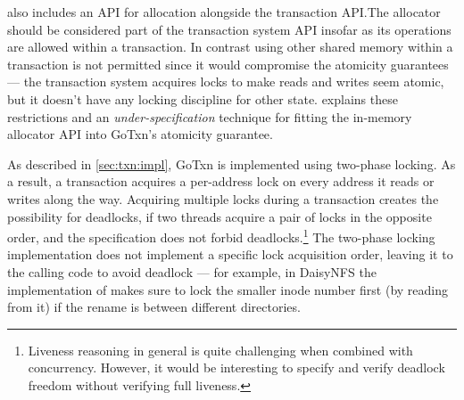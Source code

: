 also includes an API for allocation alongside the transaction
API.\@ The allocator should be considered part of the transaction system API
insofar as its operations are allowed within a transaction. In contrast using
other shared memory within a transaction is not permitted since it would
compromise the atomicity guarantees --- the transaction system acquires locks to
make reads and writes seem atomic, but it doesn't have any locking discipline
for other state.  explains these restrictions and an
\emph{under-specification} technique for fitting the
in-memory allocator API into GoTxn's atomicity guarantee.



As described in \cref{sec:txn:impl}, GoTxn is implemented using two-phase
locking. As a result, a transaction acquires a per-address lock on every address
it reads or writes along the way. Acquiring multiple locks during a transaction
creates the possibility for deadlocks, if two threads acquire a pair of locks in
the opposite order, and the specification does not forbid
deadlocks.\footnote{Liveness reasoning in general is quite challenging when
combined with concurrency. However, it would be interesting to specify and
verify deadlock freedom without verifying full liveness.} The two-phase locking
implementation does not implement a specific lock acquisition order, leaving it
to the calling code to avoid deadlock --- for example, in DaisyNFS the
implementation of  makes sure to lock the smaller inode number first
(by reading from it) if the rename is between different directories.
